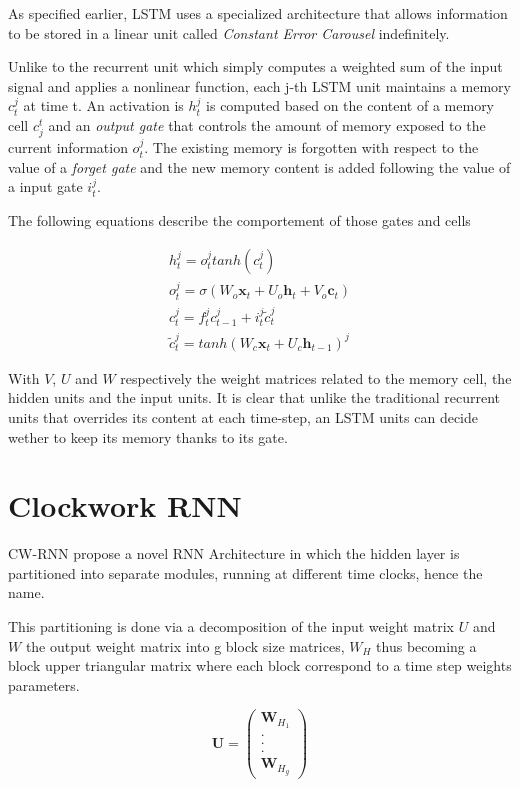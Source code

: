 \documentclass[a4paper,10pt]{article}
\begin{document}
As specified earlier, LSTM uses a specialized architecture that allows information to be stored in a linear unit called \textit{Constant Error Carousel} indefinitely.

Unlike to the recurrent unit which simply computes a weighted sum of the input signal and applies a nonlinear function, each j-th LSTM unit maintains a memory $c_t^j$ at time t. An activation is $h_t^j$ is computed based on the  content of a memory cell $c_j^t$ and an \textit{output gate} that controls the amount of memory exposed to the current information $o_t^j $. The existing memory is forgotten with respect to the value of a \textit{forget gate} and the new memory content is added following the value of a input gate $i_t^j$.

The following equations describe the comportement of those gates and cells 

\[ \begin{array}{lr}
h_t^j = o_t^jtanh(c_t^j) \\ 
o_t^j = \sigma(W_o\textbf{x}_t+U_o\textbf{h}_t+V_o\textbf{c}_t) \\
c_t^j = f_t^jc_{t-1}^j+i_t^j\tilde{c}_t^j \\
\tilde{c}_t^j = tanh(W_c\textbf{x}_t+U_c\textbf{h}_{t-1})^j
\end{array}\]

With $V$, $U$ and $W$ respectively the weight matrices related to the memory cell, the hidden units and the input units.
It is clear that unlike the traditional recurrent units that overrides its content at each time-step, an LSTM units can decide wether to keep its memory thanks to its gate.


\section{Clockwork RNN}

CW-RNN propose a novel RNN Architecture in which the hidden layer is partitioned into separate modules, running at different time clocks, hence the name.

This partitioning is done via a decomposition of the input weight matrix $U$ and $W$ the output weight matrix into g block size matrices, $W_H$ thus becoming a block upper triangular matrix where each block correspond to a time step weights parameters.

\[ 
\textbf{U} =
\left( \begin{array}{c}
\textbf{W}_{H_1}\\
\textbf{.} \\
\textbf{.} \\
\textbf{.} \\
\textbf{W}_{H_g}
\end{array} \right)\] \\
\end{document}
